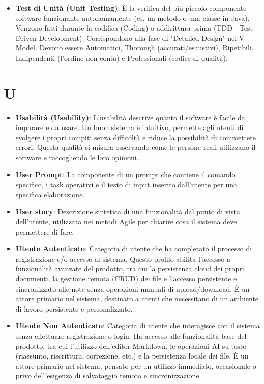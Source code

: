 \documentclass[11pt,a4paper]{article}
\begin{document}
\begin{itemize}
\item \textbf{Test di Unità (Unit Testing)}: È la verifica del più piccolo componente software funzionante autonomamente (es. un metodo o una classe in Java). Vengono fatti durante la codifica (Coding) o addirittura prima (TDD - Test Driven Development). Corrispondono alla fase di "Detailed Design" nel V-Model. Devono essere Automatici, Thorough (accurati/esaustivi), Ripetibili, Indipendenti (l'ordine non conta) e Professionali (codice di qualità).

\end{itemize}

\newpage

\section*{U}
\begin{itemize}
\item \textbf{Usabilità (Usability)}: L’usabilità descrive quanto il software è facile da imparare e da usare. Un buon sistema è intuitivo, permette agli utenti di svolgere i propri compiti senza difficoltà e riduce la possibilità di commettere errori. Questa qualità si misura osservando come le persone reali utilizzano il software e raccogliendo le loro opinioni.

\item \textbf{User Prompt}: La componente di un prompt che contiene il comando specifico, i task operativi e il testo di input inserito dall'utente per una specifica elaborazione.

\item \textbf{User story}: Descrizione sintetica di una funzionalità dal punto di vista dell’utente, utilizzata nei metodi Agile per chiarire cosa il sistema deve permettere di fare.

\item \textbf{Utente Autenticato}: Categoria di utente che ha completato il processo di registrazione e/o accesso al sistema. Questo profilo abilita l'accesso a funzionalità avanzate del prodotto, tra cui la persistenza cloud dei propri documenti, la gestione remota (CRUD) dei file e l'accesso persistente e sincronizzato alle note senza operazioni manuali di upload/download. È un attore primario nel sistema, destinato a utenti che necessitano di un ambiente di lavoro persistente e personalizzato.

\item \textbf{Utente Non Autenticato}: Categoria di utente che interagisce con il sistema senza effettuare registrazione o login. Ha accesso alle funzionalità base del prodotto, tra cui l'utilizzo dell'editor Markdown, le operazioni AI su testo (riassunto, riscrittura, correzione, etc.) e la persistenza locale dei file. È un attore primario nel sistema, pensato per un utilizzo immediato, occasionale o privo dell'esigenza di salvataggio remoto e sincronizzazione.

\end{itemize}
\end{document}
